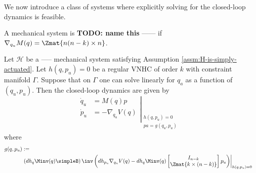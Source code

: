 We now introduce a class of systems where explicitly solving for the closed-loop
dynamics is feasible.

\begin{defn}
    A mechanical system is \textbf{TODO: name this} ------ if 
    \(\nabla_{q_u}M(q) = \Zmat{n(n-k) \times n}\).
\end{defn}

\begin{thm}\label{thm:zero-dynamics}
    Let \(\mathcal{H}\) be a ----- mechanical system satisfying Assumption
    \ref{assm:H-is-simply-actuated}. Let
    \(h(q,p_u) = 0\) be a regular VNHC of order \(k\) 
    with constraint manifold \(\Gamma\). Suppose that on \(\Gamma\) one can
    solve linearly for \(q_a\) as a function of \((q_u,p_u)\).
    Then the closed-loop dynamics are given by
    \begin{equation}\label{eqn:qpu-dynamics}
        \left.\begin{aligned}
            \dot{q}_u &= M(q)p \\
            \dot{p}_u &= -\nabla_{q_u}V(q) \\
            \end{aligned}\right|_{\begin{array}{c}
                h(q,p_u) = 0 \\ 
                pa = g(q_u,p_u) \\
            \end{array}}
    \end{equation}
    where
    \begin{equation}\label{eqn:g-qpu}
    \begin{aligned}
        g(q,p_u) &:= \\
           &\left.\left(dh_q \Minv(q) \simpleB \right)\inv 
        \left(dh_{p_u} \nabla_{q_u}V(q) - dh_q \Minv(q)
        \begin{bmatrix}
            I_{n-k} \\
            \Zmat{k \times (n-k)} \\
        \end{bmatrix} p_u\right)\right|_{h(q,p_u) = 0}
    \end{aligned}
    \end{equation}
\end{thm}
